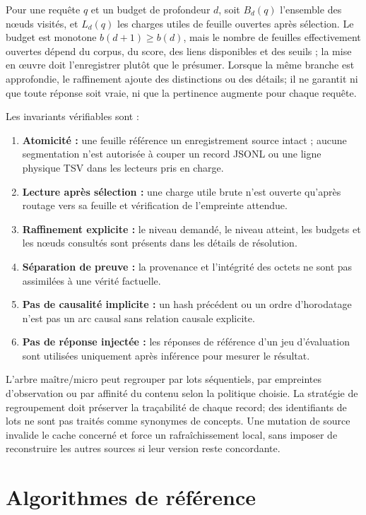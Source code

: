 \documentclass[11pt,a4paper]{article}
\begin{document}
Pour une requête $q$ et un budget de profondeur $d$, soit $B_d(q)$ l'ensemble des nœuds visités, et $L_d(q)$ les charges utiles de feuille ouvertes après sélection. Le budget est monotone $b(d+1)\geq b(d)$, mais le nombre de feuilles effectivement ouvertes dépend du corpus, du score, des liens disponibles et des seuils ; la mise en œuvre doit l'enregistrer plutôt que le présumer. Lorsque la même branche est approfondie, le raffinement ajoute des distinctions ou des détails; il ne garantit ni que toute réponse soit vraie, ni que la pertinence augmente pour chaque requête.

Les invariants vérifiables sont :
\begin{enumerate}
\item \textbf{Atomicité :} une feuille référence un enregistrement source intact ; aucune segmentation n'est autorisée à couper un record JSONL ou une ligne physique TSV dans les lecteurs pris en charge.
\item \textbf{Lecture après sélection :} une charge utile brute n'est ouverte qu'après routage vers sa feuille et vérification de l'empreinte attendue.
\item \textbf{Raffinement explicite :} le niveau demandé, le niveau atteint, les budgets et les nœuds consultés sont présents dans les détails de résolution.
\item \textbf{Séparation de preuve :} la provenance et l'intégrité des octets ne sont pas assimilées à une vérité factuelle.
\item \textbf{Pas de causalité implicite :} un hash précédent ou un ordre d'horodatage n'est pas un arc causal sans relation causale explicite.
\item \textbf{Pas de réponse injectée :} les réponses de référence d'un jeu d'évaluation sont utilisées uniquement après inférence pour mesurer le résultat.
\end{enumerate}

L'arbre maître/micro peut regrouper par lots séquentiels, par empreintes d'observation ou par affinité du contenu selon la politique choisie. La stratégie de regroupement doit préserver la traçabilité de chaque record; des identifiants de lots ne sont pas traités comme synonymes de concepts. Une mutation de source invalide le cache concerné et force un rafraîchissement local, sans imposer de reconstruire les autres sources si leur version reste concordante.

\section{Algorithmes de référence}
\end{document}
